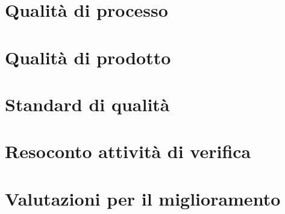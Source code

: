 \documentclass{article}
\begin{document}
\newpage
\section{Qualità di processo}%
\label{sec:qualita_di_processo}


\newpage
\section{Qualità di prodotto}%
\label{sec:qualita_di_prodotto}


\newpage
\section{Standard di qualità}%
\label{sec:standard_di_qualita}


\newpage
\section{Resoconto attività di verifica}%
\label{sec:resoconto_attivita_di_verifica}


\newpage
\section{Valutazioni per il miglioramento}%
\label{sec:valutazioni_per_il_miglioramento}

\end{document}
